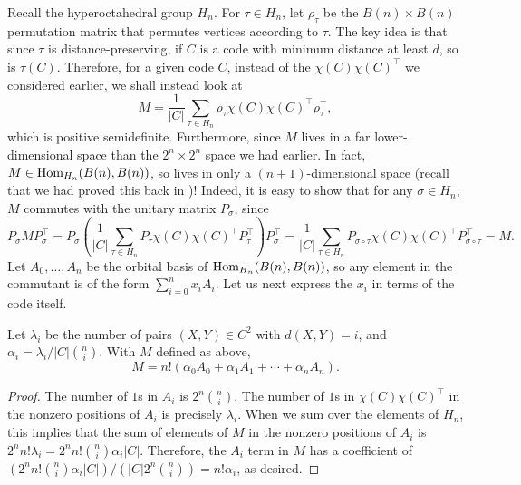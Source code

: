 	Recall the hyperoctahedral group $H_n$. For $\tau \in H_n$, let $\rho_\tau$ be the $B(n) \times B(n)$ permutation matrix that permutes vertices according to $\tau$. The key idea is that since $\tau$ is distance-preserving, if $C$ is a code with minimum distance at least $d$, so is $\tau(C)$. Therefore, for a given code $C$, instead of the $\chi(C) \chi(C)^\top$ we considered earlier, we shall instead look at
	\begin{equation}
		\label{eq:delsarte-key}
		M = \frac{1}{|C|} \sum_{\tau \in H_n} \rho_\tau \chi(C) \chi(C)^\top \rho_\tau^\top,
	\end{equation}
	which is positive semidefinite. Furthermore, since $M$ lives in a far lower-dimensional space than the $2^n \times 2^n$ space we had earlier. In fact, $M \in \operatorname{Hom}_{H_n}(B(n),B(n))$, so lives in only a $(n+1)$-dimensional space (recall that we had proved this back in )! Indeed, it is easy to show that for any $\sigma \in H_n$, $M$ commutes with the unitary matrix $P_\sigma$, since
	\begin{equation}
		\label{eq:1.4}
		P_\sigma M P_\sigma^\top = P_\sigma \left(\frac{1}{|C|} \sum_{\tau \in H_n} P_\tau \chi(C) \chi(C)^\top P_\tau^\top \right) P_\sigma^\top = \frac{1}{|C|} \sum_{\tau \in H_n} P_{\sigma \circ \tau} \chi(C) \chi(C)^\top P_{\sigma \circ \tau}^\top = M.
	\end{equation}
	Let $A_0,\ldots,A_n$ be the orbital basis of $\operatorname{Hom}_{H_n}(B(n),B(n))$, so any element in the commutant is of the form $\sum_{i=0}^n x_i A_i$. Let us next express the $x_i$ in terms of the code itself.

	\begin{fprop}
		\label{prop:delsarte-1}
		Let $\lambda_i$ be the number of pairs $(X,Y) \in C^2$ with $d(X,Y) = i$, and $\alpha_i = \lambda_i / |C| \binom{n}{i}$.  With $M$ defined as above,
		\[ M = n! (\alpha_0 A_0 + \alpha_1 A_1 + \cdots + \alpha_n A_n).  \]
	\end{fprop}
	\begin{proof}
		The number of $1$s in $A_i$ is $2^n \binom{n}{i}$. The number of $1$s in $\chi(C)\chi(C)^\top$ in the nonzero positions of $A_i$ is precisely $\lambda_i$. When we sum over the elements of $H_n$, this implies that the sum of elements of $M$ in the nonzero positions of $A_i$ is $2^n n! \lambda_i = 2^n n! \binom{n}{i} \alpha_i |C|$. Therefore, the $A_i$ term in $M$ has a coefficient of $(2^n n! \binom{n}{i} \alpha_i |C|)/(|C| 2^n \binom{n}{i}) = n! \alpha_i$, as desired.
	\end{proof}

